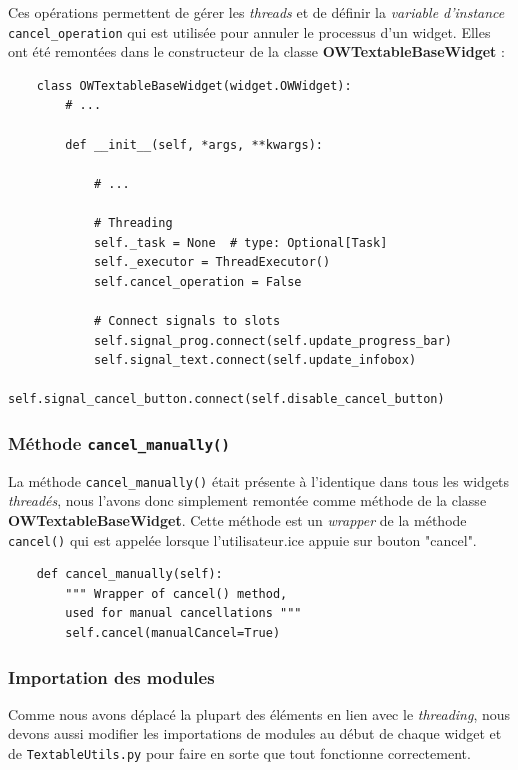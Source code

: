 \documentclass{article}
\begin{document}
Ces opérations permettent de gérer les \textit{threads} et de définir la \textit{variable d'instance} \texttt{cancel\_operation} qui est utilisée pour annuler le processus d'un widget. Elles ont été remontées dans le constructeur de la classe \textbf{OWTextableBaseWidget} : 

\begin{verbatim}
    class OWTextableBaseWidget(widget.OWWidget):
        # ...
        
        def __init__(self, *args, **kwargs):

            # ...

            # Threading
            self._task = None  # type: Optional[Task]
            self._executor = ThreadExecutor()
            self.cancel_operation = False

            # Connect signals to slots
            self.signal_prog.connect(self.update_progress_bar) 
            self.signal_text.connect(self.update_infobox)
            self.signal_cancel_button.connect(self.disable_cancel_button)
\end{verbatim}

\subsubsection{Méthode \texttt{cancel\_manually()}}

La méthode \texttt{cancel\_manually()} était présente à l'identique dans tous les widgets \textit{threadés}, nous l'avons donc simplement remontée comme méthode de la classe \textbf{OWTextableBaseWidget}. Cette méthode est un \textit{wrapper} de la méthode \texttt{cancel()} qui est appelée lorsque l'utilisateur.ice appuie sur bouton "cancel".

\begin{verbatim}
    def cancel_manually(self):
        """ Wrapper of cancel() method,
        used for manual cancellations """
        self.cancel(manualCancel=True)
\end{verbatim}

\subsubsection{Importation des modules}

Comme nous avons déplacé la plupart des éléments en lien avec le \textit{threading}, nous devons aussi modifier les importations de modules au début de chaque widget et de \texttt{TextableUtils.py} pour faire en sorte que tout fonctionne correctement.
\end{document}
